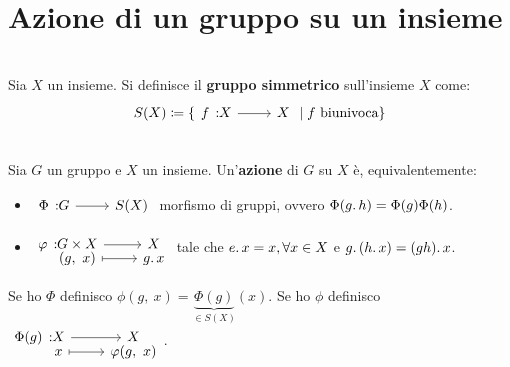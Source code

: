 \section{Azione di un gruppo su un insieme}
\begin{define}~{}\\
	Sia $X$ un insieme. Si definisce il \textbf{gruppo simmetrico} sull'insieme $X$ come:
	\begin{equation}
		S(X)\coloneqq \{\funz f X X \mid f \text{ biunivoca}\}
	\end{equation}
\vspace{-6mm}
\end{define}
\begin{define}~{}\\
	Sia $G$ un gruppo e $X$ un insieme. Un'\textbf{azione} di $G$ su $X$ è, equivalentemente:
		\begin{itemize}
			\item  $\funz \Phi G {S(X)}$ morfismo di gruppi, ovvero $\Phi(g\ldotp h)=\Phi(g)\Phi(h)$.
			\item $\funztot \phi {G\times X} X {(g,\ x)} {g\ldotp x}$ tale che $e\ldotp x=x, \forall x\in X$ e $g\ldotp (h\ldotp x)=(gh)\ldotp x$.
		\end{itemize}
	Se ho $\Phi$ definisco $\phi(g,\ x)=\underbrace{\Phi(g)}_{\in S(X)}(x)$.\newline
	Se ho $\phi$ definisco $\funztot {\Phi(g)} X X x {\phi(g,\ x)}$.
\end{define}

